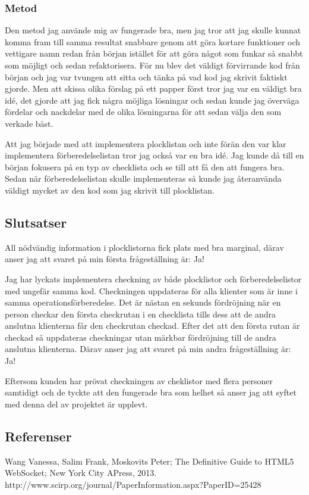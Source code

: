 \subsubsection{Metod}
Den metod jag använde mig av fungerade bra, men jag tror att jag skulle kunnat komma fram till samma resultat snabbare genom att göra kortare funktioner och vettigare namn redan från början istället för att göra något som funkar så snabbt som möjligt och sedan refaktorisera. För nu blev det väldigt förvirrande kod från början och jag var tvungen att sitta och tänka på vad kod jag skrivit faktiskt gjorde. Men att skissa olika förslag på ett papper först tror jag var en väldigt bra idé, det gjorde att jag fick några möjliga lösningar och sedan kunde jag överväga fördelar och nackdelar med de olika lösningarna för att sedan välja den som verkade bäst.

Att jag började med att implementera plocklistan och inte förän den var klar implementera förberedelselistan tror jag också var en bra idé. Jag kunde då till en början fokusera på en typ av checklista och se till att få den att fungera bra. Sedan när förberedelselistan skulle implementeras så kunde jag återanvända väldigt mycket av den kod som jag skrivit till plocklistan.
\pagebreak
\subsection{Slutsatser}
All nödvändig information i plocklistorna fick plats med bra marginal, därav anser jag att svaret på min första frågeställning är: Ja!

Jag har lyckats implementera checkning av både plocklistor och förberedelselistor med ungefär samma kod. Checkningen uppdateras för alla klienter som är inne i samma operationsförberedelse. Det är nästan en sekunds fördröjning när en person checkar den första checkrutan i en checklista tills dess att de andra anslutna klienterna får den checkrutan checkad. Efter det att den första rutan är checkad så uppdateras checkningar utan märkbar fördröjning till de andra anslutna klienterna. Därav anser jag att svaret på min andra frågeställning är: Ja!

Eftersom kunden har prövat checkningen av cheklistor med flera personer samtidigt och de tyckte att den fungerade bra som helhet så anser jag att syftet med denna del av projektet är upplevt.

\subsection{Referenser}
\vspace{-9mm}
\begin{thebibliography}{9}
 Wang Vanessa, Salim Frank, Moskovits Peter; The Definitive Guide to HTML5 WebSocket; New York City APress, 2013.
 http://www.scirp.org/journal/PaperInformation.aspx?PaperID=25428
\end{thebibliography}